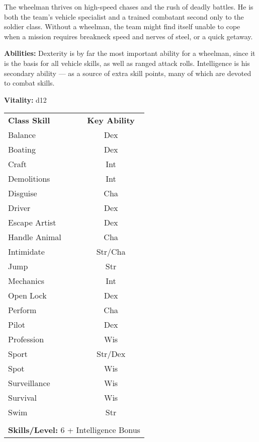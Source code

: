 \begin{multicols}{2}

The wheelman thrives on high-speed chases and the rush of deadly battles. He is both the team’s vehicle specialist and a trained combatant second only to the soldier class. Without a wheelman, the team might find itself unable to cope when a mission requires breakneck speed and nerves of steel, or a quick getaway.

\columnbreak

\textbf{Abilities:} Dexterity is by far the most important ability for a wheelman, since it is the basis for all vehicle skills, as well as ranged attack rolls. Intelligence is his secondary ability — as a source of extra skill points, many of which are devoted to combat skills.

\textbf{Vitality:} d12

\end{multicols}

\begin{table}[htb]
\raggedright
\begin{tabular}{l c}
\textbf{Class Skill} & \textbf{Key Ability}\\

Balance & Dex\\
Boating & Dex\\
Craft & Int\\
Demolitions & Int\\
Disguise & Cha\\
Driver & Dex\\
Escape Artist	& Dex\\
Handle Animal &Cha\\
Intimidate & Str/Cha\\
Jump & Str\\
Mechanics & Int\\
Open Lock & Dex\\
Perform & Cha\\
Pilot & Dex\\
Profession & Wis\\
Sport & Str/Dex\\
Spot & Wis\\
Surveillance & Wis\\
Survival & Wis\\
Swim & Str\\

\multicolumn{2}{l}{\cellcolor{white}}\\
\multicolumn{2}{l}{\cellcolor{white}\textbf{Skills/Level:} 6 + Intelligence Bonus}\\
\end{tabular}
\end{table}

